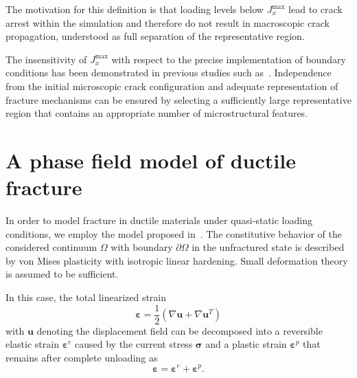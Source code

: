 \documentclass[pdflatex,sn-mathphys-num]{sn-jnl}%
\theoremstyle{thmstyleone}%
\theoremstyle{thmstyletwo}%
\theoremstyle{thmstylethree}%
\begin{document}
The motivation for this definition is that loading levels below $J_x^{\text{max}}$ lead to crack arrest within the simulation and 
therefore do not result in macroscopic crack propagation, 
understood as full separation of the representative region.

The insensitivity of $J_x^{\text{max}}$ with respect to the precise implementation of boundary conditions has been demonstrated in previous studies such as~\cite{hossain_effective_2014, bohnen_simulation_2024}.
Independence from the initial microscopic crack configuration and adequate representation of fracture mechanisms can be ensured by selecting a sufficiently large representative region that contains an appropriate number of microstructural features.


\section{A phase field model of ductile fracture}\label{sec:phase_fiel_model_ductile}

In order to model fracture in ductile materials under quasi-static loading conditions, we employ the model proposed in~\cite{noll_3d_2020}. 
The constitutive behavior of the considered continuum $\Omega$ with boundary $\partial\Omega$ in the unfractured state is described by von Mises plasticity with isotropic linear hardening. 
Small deformation theory is assumed to be sufficient.

In this case, the total linearized strain
\begin{equation}
    \boldsymbol{\varepsilon} = \dfrac{1}{2}\left(\nabla{\boldsymbol{u}} + \nabla{\boldsymbol{u}}^T\right)
\end{equation}
with $\boldsymbol{u}$ denoting the displacement field can be decomposed into a reversible elastic strain $\boldsymbol{\varepsilon}^e$ caused by the current stress $\boldsymbol{\sigma}$ and a plastic strain $\boldsymbol{\varepsilon}^p$ that remains after complete unloading as
\begin{equation}
  \boldsymbol{\varepsilon} =  \boldsymbol{\varepsilon}^e + \boldsymbol{\varepsilon}^p.
\end{equation}
\end{document}
